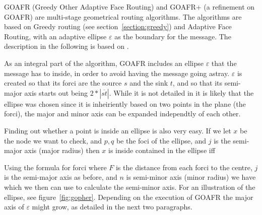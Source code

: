 GOAFR (Greedy Other Adaptive Face Routing) \cite{gopher} and GOAFR+ (a refinement on GOAFR) \cite{gopher+} are multi-stage geometrical routing algorithms. The algorithms are based on Greedy routing (see section~\ref{section:greedy}) and Adaptive Face Routing, with an adaptive ellipse $\varepsilon$ as the boundary for the message. The description in the following is based on \cite{gopher}.

As an integral part of the algorithm, GOAFR includes an ellipse $\varepsilon$ that the message has to inside, in order to avoid having the message going astray. $\varepsilon$ is created so that its forci are the source $s$ and the sink $t$, and so that its semi-major axis starts out being $2 * |\overline{st}|$. While it is not detailed in \cite{gopher} it is likely that the ellipse was chosen since it is inheiriently based on two points in the plane (the forci), the major and minor axis can be expanded independtly of each other. 

Finding out whether a point is inside an ellipse is also very easy. If we let $x$ be the node we want to check, and $p, q$ be the foci of the ellipse, and $j$ is the semi-major axis (major radius) then $x$ is inside contained in the ellipse iff 

Using the formula for forci
where $F$ is the distance from each forci to the centre, $j$ is the semi-major axis as before, and $n$ is semi-minor axis (minor radius) we have
which we then can use to calculate the semi-minor axis. For an illustration of the ellipse, see figure~\ref{fig:gopher}. Depending on the execution of GOAFR the major axis of $\varepsilon$ might grow, as detailed in the next two paragraphs. 

